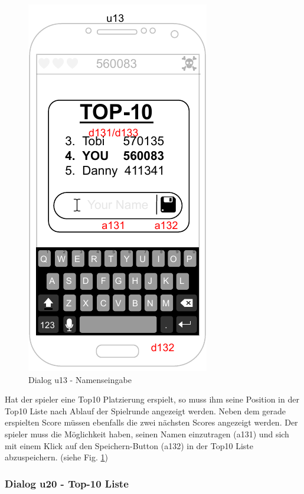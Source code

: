 \begin{figure}[h!]
    \begin{center}
    \includegraphics[scale=1.4]{diagramme/pdf/Mockup-u13.pdf}
    \end{center}
    \caption{Dialog u13 - Namenseingabe}\label{fig:dia:u13}
\end{figure}

Hat der \gls{spieler} eine \gls{Top10} Platzierung erspielt, so muss ihm seine Position in der \gls{Top10} Liste nach Ablauf der Spielrunde angezeigt werden.
Neben dem gerade erspielten Score müssen ebenfalls die zwei nächsten Scores angezeigt werden.
Der \gls{spieler} muss die Möglichkeit haben, seinen Namen einzutragen (a131) und sich mit einem Klick auf den Speichern-Button (a132) in der \gls{Top10} Liste abzuspeichern.
(siehe Fig. \ref{fig:dia:u13})
\clearpage

\subsubsection{Dialog u20 - Top-10 Liste}\label{dialog:top10}

